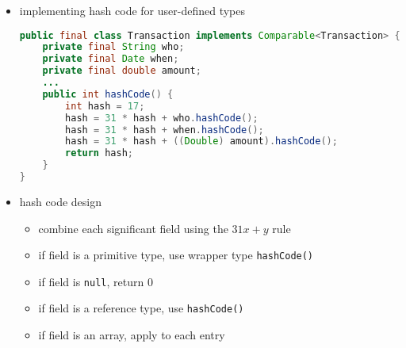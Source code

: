 \documentclass[8pt,a4paper,compress]{beamer}
\begin{document}
\begin{frame}[fragile]
\begin{itemize}
\item implementing hash code for user-defined types
\begin{lstlisting}[language=Java]
public final class Transaction implements Comparable<Transaction> {
    private final String who;
    private final Date when;
    private final double amount;
    ...
    public int hashCode() {
        int hash = 17;
        hash = 31 * hash + who.hashCode();
        hash = 31 * hash + when.hashCode();
        hash = 31 * hash + ((Double) amount).hashCode();
        return hash;
    }
}
\end{lstlisting}

\item hash code design
\begin{itemize}
\item combine each significant field using the $31x + y$ rule

\item if field is a primitive type, use wrapper type \lstinline{hashCode()}

\item if field is \lstinline{null}, return 0

\item if field is a reference type, use \lstinline{hashCode()}

\item if field is an array, apply to each entry
\end{itemize}
\end{itemize}
\end{frame}
\end{document}
